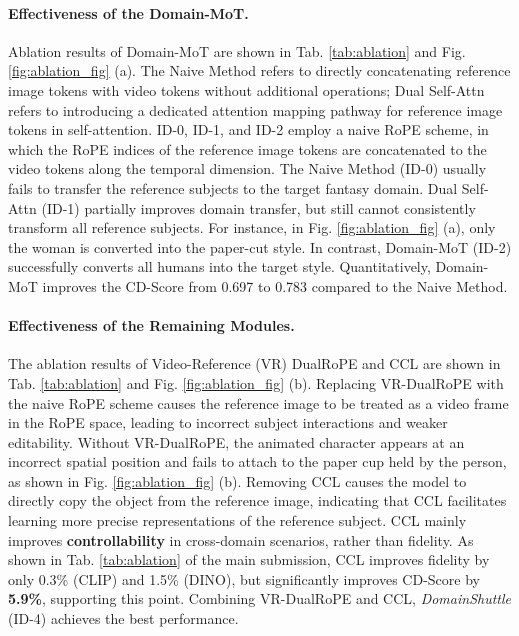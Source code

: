 \paragraph{\textbf{Effectiveness of the Domain-MoT.}}  Ablation results of Domain-MoT are shown in Tab. \ref{tab:ablation} and Fig. \ref{fig:ablation_fig} (a). The Naive Method refers to directly concatenating reference image tokens with video tokens without additional operations; Dual Self-Attn refers to introducing a dedicated attention mapping pathway for reference image tokens in self-attention. ID-0, ID-1, and ID-2 employ a naive RoPE scheme, in which the RoPE indices of the reference image tokens are concatenated to the video tokens along the temporal dimension. The Naive Method (ID-0) usually fails to transfer the reference subjects to the target fantasy domain. Dual Self-Attn (ID-1) partially improves domain transfer, but still cannot consistently transform all reference subjects. For instance, in  Fig. \ref{fig:ablation_fig} (a), only the woman is converted into the paper-cut style. In contrast, Domain-MoT (ID-2) successfully converts all humans into the target style. Quantitatively, Domain-MoT improves the CD-Score from 0.697 to 0.783 compared to the Naive Method.






\paragraph{\textbf{Effectiveness of the Remaining Modules.}} The ablation results of Video-Reference (VR) DualRoPE and CCL are shown in Tab. \ref{tab:ablation} and Fig. \ref{fig:ablation_fig} (b). Replacing VR-DualRoPE with the naive RoPE scheme causes the reference image to be treated as a video frame in the RoPE space, leading to incorrect subject interactions and weaker editability. Without VR-DualRoPE, the animated character appears at an incorrect spatial position and fails to attach to the paper cup held by the person, as shown in Fig. \ref{fig:ablation_fig} (b). Removing CCL causes the model to directly copy the object from the reference image, indicating that CCL facilitates learning more precise representations of the reference subject. CCL mainly improves \textbf{controllability} in cross-domain scenarios, rather than fidelity. As shown in Tab. \ref{tab:ablation} of the main submission, CCL improves fidelity by only 0.3\% (CLIP) and 1.5\% (DINO), but significantly improves CD-Score by \textbf{5.9\%}, supporting this point. Combining VR-DualRoPE and CCL, \textit{DomainShuttle} (ID-4) achieves the best performance.




